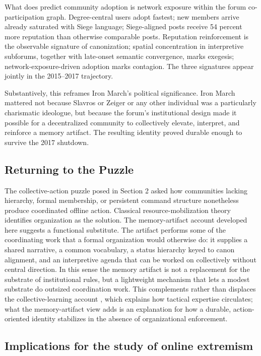\documentclass[bibtex,autowc,nonblind]{apsr_submission}
\begin{document}
What does predict community adoption is network exposure within the forum co-participation graph. Degree-central users adopt fastest; new members arrive already saturated with Siege language; Siege-aligned posts receive 54 percent more reputation than otherwise comparable posts. Reputation reinforcement is the observable signature of canonization; spatial concentration in interpretive subforums, together with late-onset semantic convergence, marks exegesis; network-exposure-driven adoption marks contagion. The three signatures appear jointly in the 2015--2017 trajectory.

Substantively, this reframes Iron March's political significance. Iron March mattered not because Slavros or Zeiger or any other individual was a particularly charismatic ideologue, but because the forum's institutional design made it possible for a decentralized community to collectively elevate, interpret, and reinforce a memory artifact. The resulting identity proved durable enough to survive the 2017 shutdown.

\subsection{Returning to the Puzzle}

The collective-action puzzle posed in Section 2 asked how communities lacking hierarchy, formal membership, or persistent command structure nonetheless produce coordinated offline action. Classical resource-mobilization theory \citep{mccarthy1977resource, tilly2017mobilization, olson1971logic} identifies organization as the solution. The memory-artifact account developed here suggests a functional substitute. The artifact performs some of the coordinating work that a formal organization would otherwise do: it supplies a shared narrative, a common vocabulary, a status hierarchy keyed to canon alignment, and an interpretive agenda that can be worked on collectively without central direction. In this sense the memory artifact is not a replacement for the substrate of institutional rules, but a lightweight mechanism that lets a modest substrate do outsized coordination work. This complements rather than displaces the collective-learning account \citep{kenney2020community, lee2022, furstenberg2024decentralized}, which explains how tactical expertise circulates; what the memory-artifact view adds is an explanation for how a durable, action-oriented identity stabilizes in the absence of organizational enforcement.

\subsection{Implications for the study of online extremism}
\end{document}
